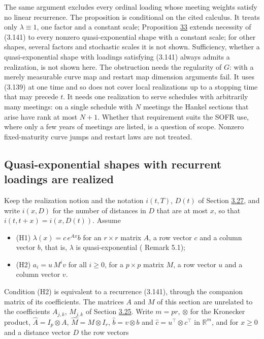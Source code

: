 \documentclass[11pt]{article}
\begin{document}
The same argument excludes every ordinal loading whose meeting weights satisfy no linear recurrence. The proposition is conditional on the cited calculus. It treats only \(\lambda\equiv1\), one factor and a constant scale; Proposition \hyperref[res:Proposition-33]{33} extends necessity of (3.141) to every nonzero quasi-exponential shape with a constant scale; for other shapes, several factors and stochastic scales it is not shown. Sufficiency, whether a quasi-exponential shape with loadings satisfying (3.141) always admits a realization, is not shown here. The obstruction needs the regularity of \(G\): with a merely measurable curve map and restart map dimension arguments fail. It uses (3.139) at one time and so does not cover local realizations up to a stopping time that may precede \(t\). It needs one realization to serve schedules with arbitrarily many meetings: on a single schedule with \(N\) meetings the Hankel sections that arise have rank at most \(N+1\). Whether that requirement suits the SOFR use, where only a few years of meetings are listed, is a question of scope. Nonzero fixed-maturity curve jumps and restart laws are not treated.

\subsection{Quasi-exponential shapes with recurrent loadings are realized}\label{sec:3.28}

Keep the realization notion and the notation \(i(t,T)\), \(D(t)\) of Section \hyperref[sec:3.27]{3.27}, and write \(i(x,D)\) for the number of distances in \(D\) that are at most \(x\), so that \(i(t,t+x)=i(x,D(t))\). Assume

\begin{itemize}
  \item (H1) \(\lambda(x)=c\,e^{Ax}b\) for an \(r\times r\) matrix \(A\), a row vector \(c\) and a column vector \(b\), that is, \(\lambda\) is quasi-exponential (\cite{bjork2001existence} Remark 5.1);
  \item (H2) \(a_i=u\,M^iv\) for all \(i\ge0\), for a \(p\times p\) matrix \(M\), a row vector \(u\) and a column vector \(v\).
\end{itemize}

Condition (H2) is equivalent to a recurrence (3.141), through the companion matrix of its coefficients. The matrices \(A\) and \(M\) of this section are unrelated to the coefficients \(A_{j,k}\), \(M_{j,k}\) of Section \hyperref[sec:3.25]{3.25}. Write \(m=pr\), \(\otimes\) for the Kronecker product, \(\hat A=I_p\otimes A\), \(\hat M=M\otimes I_r\), \(\hat b=v\otimes b\) and \(\hat c=u^\top\otimes c^\top\) in \(\mathbb R^m\), and for \(x\ge0\) and a distance vector \(D\) the row vectors
\end{document}
